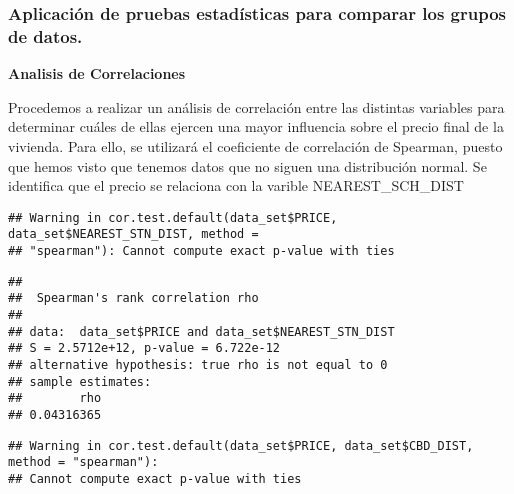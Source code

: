 \documentclass[
]{article}
\newenvironment{Shaded}{\begin{snugshade}}{\end{snugshade}}
\newcommand{\AttributeTok}[1]{\textcolor[rgb]{0.77,0.63,0.00}{#1}}
\newcommand{\FunctionTok}[1]{\textcolor[rgb]{0.00,0.00,0.00}{#1}}
\newcommand{\NormalTok}[1]{#1}
\newcommand{\SpecialCharTok}[1]{\textcolor[rgb]{0.00,0.00,0.00}{#1}}
\newcommand{\StringTok}[1]{\textcolor[rgb]{0.31,0.60,0.02}{#1}}
\begin{document}
\hypertarget{aplicaciuxf3n-de-pruebas-estaduxedsticas-para-comparar-los-grupos-de-datos.}{%
\subsubsection{Aplicación de pruebas estadísticas para comparar los
grupos de
datos.}\label{aplicaciuxf3n-de-pruebas-estaduxedsticas-para-comparar-los-grupos-de-datos.}}

\textbf{Analisis de Correlaciones}

Procedemos a realizar un análisis de correlación entre las distintas
variables para determinar cuáles de ellas ejercen una mayor influencia
sobre el precio final de la vivienda. Para ello, se utilizará el
coeficiente de correlación de Spearman, puesto que hemos visto que
tenemos datos que no siguen una distribución normal. Se identifica que
el precio se relaciona con la varible NEAREST\_SCH\_DIST

\begin{Shaded}
\end{Shaded}

\begin{verbatim}
## Warning in cor.test.default(data_set$PRICE, data_set$NEAREST_STN_DIST, method =
## "spearman"): Cannot compute exact p-value with ties
\end{verbatim}

\begin{verbatim}
## 
##  Spearman's rank correlation rho
## 
## data:  data_set$PRICE and data_set$NEAREST_STN_DIST
## S = 2.5712e+12, p-value = 6.722e-12
## alternative hypothesis: true rho is not equal to 0
## sample estimates:
##        rho 
## 0.04316365
\end{verbatim}

\begin{Shaded}
\end{Shaded}

\begin{verbatim}
## Warning in cor.test.default(data_set$PRICE, data_set$CBD_DIST, method = "spearman"):
## Cannot compute exact p-value with ties
\end{verbatim}
\end{document}
